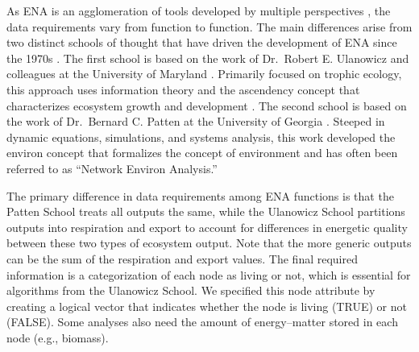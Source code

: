 \documentclass[11pt]{article}
\begin{document}
\begin{spacing}{2}
As ENA is an agglomeration of tools developed by multiple perspectives
\citep[e.g.,][]{patten59, margalef63, hannon73, pimm82,
  golley1993history}, the data requirements vary from function to
function. The main differences arise from two distinct schools of
thought that have driven the development of ENA since the 1970s
\citep{scharler09comparing}.  The first school is based on the work of
Dr.\ Robert E. Ulanowicz and colleagues at the University of Maryland
\citep{ulanowicz86, ulanowicz97, ulanowicz09_window}.  Primarily
focused on trophic ecology, this approach uses information theory and
the ascendency concept that characterizes ecosystem growth and
development \citet{ulanowicz86, ulanowicz97}.  The second school is
based on the work of Dr.\ Bernard C. Patten at the University of
Georgia \citep{patten76, matis81, patten82, fath99_review}.  Steeped
in dynamic equations, simulations, and systems analysis, this work
developed the environ concept that formalizes the concept of
environment \citep{patten78} and has often been referred to as
``Network Environ Analysis.'' 

The primary difference in data requirements among ENA functions is
that the Patten School treats all outputs the same, while the
Ulanowicz School partitions outputs into respiration
and export 
to account for differences in energetic quality between these two
types of ecosystem output. Note that the more
generic outputs can be the sum of the respiration and export values.
The final required information is a categorization of each node as
living or not, which is essential for algorithms from the Ulanowicz
School.  We specified this node attribute by creating a logical vector
that indicates whether the %
node is living (TRUE) or not (FALSE). Some analyses also need the amount of energy--matter stored
in each node (e.g., biomass).%


\end{spacing}
\end{document}
